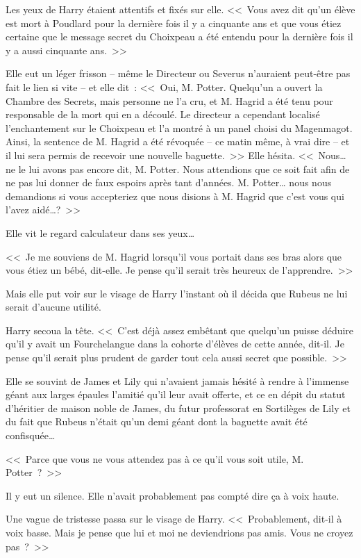 Les yeux de Harry étaient attentifs et fixés sur elle. <<~Vous avez dit qu'un élève est mort à Poudlard pour la dernière fois il y a cinquante ans et que vous étiez certaine que le message secret du Choixpeau a été entendu pour la dernière fois il y a aussi cinquante ans.~>>

Elle eut un léger frisson -- même le Directeur ou Severus n'auraient peut-être pas fait le lien si vite -- et elle dit~: <<~Oui, M. Potter. Quelqu'un a ouvert la Chambre des Secrets, mais personne ne l'a cru, et M. Hagrid a été tenu pour responsable de la mort qui en a découlé. Le directeur a cependant localisé l'enchantement sur le Choixpeau et l'a montré à un panel choisi du Magenmagot. Ainsi, la sentence de M. Hagrid a été révoquée -- ce matin même, à vrai dire -- et il lui sera permis de recevoir une nouvelle baguette.~>> Elle hésita. <<~Nous… ne le lui avons pas encore dit, M. Potter. Nous attendions que ce soit fait afin de ne pas lui donner de faux espoirs après tant d'années. M. Potter… nous nous demandions si vous accepteriez que nous disions à M. Hagrid que c'est vous qui l'avez aidé…?~>>

Elle vit le regard calculateur dans ses yeux…

<<~Je me souviens de M. Hagrid lorsqu'il vous portait dans ses bras alors que vous étiez un bébé, dit-elle. Je pense qu'il serait très heureux de l'apprendre.~>>

Mais elle put voir sur le visage de Harry l'instant où il décida que Rubeus ne lui serait d'aucune utilité.

Harry secoua la tête. <<~C'est déjà assez embêtant que quelqu'un puisse déduire qu'il y avait un Fourchelangue dans la cohorte d'élèves de cette année, dit-il. Je pense qu'il serait plus prudent de garder tout cela aussi secret que possible.~>>

Elle se souvint de James et Lily qui n'avaient jamais hésité à rendre à l'immense géant aux larges épaules l'amitié qu'il leur avait offerte, et ce en dépit du statut d'héritier de maison noble de James, du futur professorat en Sortilèges de Lily et du fait que Rubeus n'était qu'un demi géant dont la baguette avait été confisquée…

<<~Parce que vous ne vous attendez pas à ce qu'il vous soit utile, M. Potter~?~>>

Il y eut un silence. Elle n'avait probablement pas compté dire ça à voix haute.

Une vague de tristesse passa sur le visage de Harry. <<~Probablement, dit-il à voix basse. Mais je pense que lui et moi ne deviendrions pas amis. Vous ne croyez pas~?~>>

